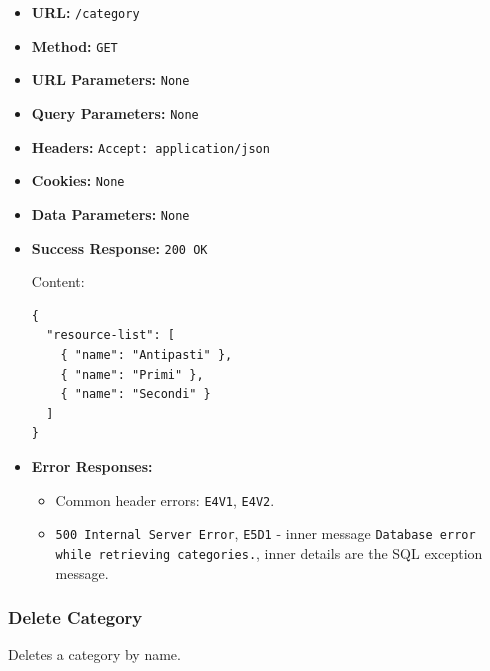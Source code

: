 \begin{itemize}[nosep]
\item \textbf{URL:} \texttt{/category}

\item \textbf{Method:} \texttt{GET}

\item \textbf{URL Parameters:} \texttt{None}

\item \textbf{Query Parameters:} \texttt{None}

\item \textbf{Headers:} \texttt{Accept: application/json}

\item \textbf{Cookies:} \texttt{None}

\item \textbf{Data Parameters:} \texttt{None}

\item \textbf{Success Response:} \texttt{200 OK}

Content:

\begin{lstlisting}
{
  "resource-list": [
    { "name": "Antipasti" },
    { "name": "Primi" },
    { "name": "Secondi" }
  ]
}
\end{lstlisting}

\item \textbf{Error Responses:}

\begin{itemize}[nosep]
\item Common header errors: \texttt{E4V1}, \texttt{E4V2}.
\item \texttt{500 Internal Server Error}, \texttt{E5D1} - inner message \texttt{Database error while retrieving categories.}, inner details are the SQL exception message.
\end{itemize}

\end{itemize}

\subsubsection*{Delete Category}

Deletes a category by name.

